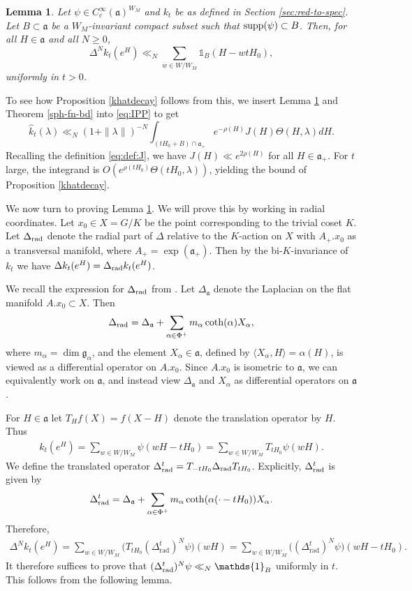 \documentclass[12pt]{amsart}
\newtheorem{lemma}[theorem]{Lemma}
\theoremstyle{remark}
\newcommand{\g}{\mathfrak g}
\newcommand{\ga}{\mathfrak a}
\begin{document}
\begin{lemma}\label{lemma:DeltaM}
Let $\psi\in C_c^\infty(\ga)^{W_M}$ and $k_t$ be as defined in Section \ref{sec:red-to-spec}. Let $B\subset\ga$ be a $W_M$-invariant compact subset such that $\textnormal{supp} (\psi) \subset B$. Then, for all $H\in\ga$ and all $N\ge 0$,
\[
\Delta^Nk_t(e^H)\ll_N \sum_{w\in  W/W_M}{\mathds{1}}_B(H-wtH_0),
\]
uniformly in $t>0$.
\end{lemma}


To see how Proposition \ref{khatdecay} follows from this, we insert Lemma \ref{lemma:DeltaM} and Theorem \ref{sph-fn-bd} into \eqref{eq:IPP} to get
\[
\widehat{k}_t(\lambda)\ll_N (1+\|\lambda\|)^{-N} \int_{(tH_0 + B) \cap \mathfrak{a}_+} e^{-\rho(H)} J(H) \Theta(H, \lambda) dH.
\]
Recalling the definition \eqref{eq:def:J}, we have $J(H)\ll e^{2\rho (H)}$ for all $H\in\ga_+$. For $t$ large, the integrand is $O(e^{\rho(t H_0)} \Theta(t H_0, \lambda))$, yielding the bound of Proposition \ref{khatdecay}.

We now turn to proving Lemma \ref{lemma:DeltaM}.  We will prove this by working in radial coordinates.  Let $x_0\in X = G/K$ be the point corresponding to the trivial coset $K$. Let $\Delta_{\rm rad}$ denote the radial part of $\Delta$ relative to the $K$-action on $X$ with $A_+.x_0$ as a transversal manifold, where $A_+ = \exp(\mathfrak{a}_+)$. Then by the bi-$K$-invariance of $k_t$ we have $\Delta k_t(e^H)=\Delta_{\rm rad}k_t(e^H)$. 

We recall the expression for $\Delta_{\rm rad}$ from \cite[Ch. II, Prop. 3.9]{Helgason_00}. Let $\Delta_\mathfrak{a}$ denote the Laplacian on the flat manifold $A.x_0\subset X$. Then
\[
\Delta_{\rm rad}=\Delta_\mathfrak{a}+\sum_{\alpha\in\Phi^+} m_\alpha \coth(\alpha) X_\alpha,
\]
where $m_\alpha=\dim \g_\alpha$, and the element $X_\alpha\in\ga$, defined by $\langle X_\alpha,H\rangle = \alpha(H)$, is viewed as a differential operator on $A.x_0$. Since $A.x_0$ is isometric to $\mathfrak{a}$, we can equivalently work on $\mathfrak{a}$, and instead view $\Delta_{\mathfrak{a}}$ and $X_\alpha$ as differential operators on $\mathfrak{a}$.

For $H\in\ga$ let $T_H f(X)= f(X -H)$ denote the translation operator by $H$. Thus 
\begin{gather*}
    k_t(e^H) = \sum_{w \in W/ W_M} \psi(w H - t H_0) = \sum_{w \in W/ W_M } T_{t H_0} \psi(w H).
\end{gather*}
We define the translated operator $\Delta_{\rm rad}^t = T_{-t H_0} \Delta_{\rm rad} T_{t H_0}$. Explicitly, $\Delta_{\rm rad}^t$ is given by
\[
\Delta_{\rm rad}^t = \Delta_\mathfrak{a} + \sum_{\alpha \in \Phi^+} m_\alpha \coth( \alpha( \cdot - tH_0) ) X_\alpha.
\]
Therefore,
\begin{gather*}
    \Delta^N k_t(e^H) = \sum_{w \in W/ W_M } \big(T_{t H_0} (\Delta_\text{rad}^{t})^N \psi \big)(w H) = \sum_{w \in W / W_M} \big((\Delta_\text{rad}^{t})^N \psi \big)(w H - t H_0).
\end{gather*}
It therefore suffices to prove that $(\Delta_{\rm rad}^t)^N \psi \ll_N {\mathds{1}}_B$ uniformly in $t$. This follows from the following lemma.
\end{document}
